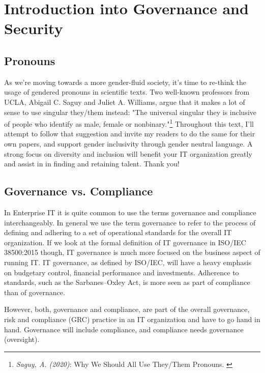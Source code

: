 %
%

\pagebreak
\section{Introduction into Governance and Security}

\onehalfspacing

\subsection{Pronouns}

As we're moving towards a more gender-fluid society, it's time to re-think the usage of gendered pronouns in scientific texts. Two well-known professors from UCLA, Abigail C. Saguy and Juliet A. Williams, argue that it makes a lot of sense to use singular they/them instead: "The universal singular they is inclusive of people who identify as male, female or nonbinary."\footnote{\textit{Saguy, A. (2020)}: Why We Should All Use They/Them Pronouns. \cite{pronouns}} Throughout this text, I'll attempt to follow that suggestion and invite my readers to do the same for their own papers, and support gender inclusivity through gender neutral language. A strong focus on diversity and inclusion will benefit your IT organization greatly and assist in in finding and retaining talent. Thank you!

\subsection{Governance vs. Compliance}

In Enterprise IT it is quite common to use the terms governance and compliance interchangeably. In general we use the term governance to refer to the process of defining and adhering to a set of operational standards for the overall IT organization. If we look at the formal definition of IT governance in ISO/IEC 38500:2015 though, IT governance is much more focused on the business aspect of running IT. IT governance, as defined by ISO/IEC, will have a heavy emphasis on budgetary control, financial performance and investments. Adherence to standards, such as the Sarbanes–Oxley Act, is more seen as part of compliance than of governance.

However, both, governance and compliance, are part of the overall governance, risk and compliance (GRC) practice in an IT organization and have to go hand in hand. Governance will include compliance, and compliance needs governance (oversight).

